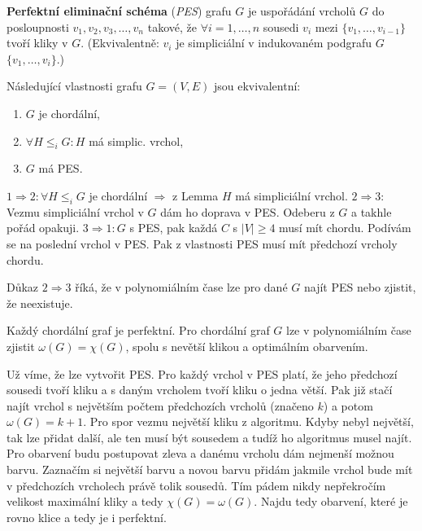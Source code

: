 \begin{definice}
	\textbf{Perfektní eliminační schéma} (\textit{PES}) grafu $G$ je uspořádání vrcholů $G$ do posloupnosti $v_{1}, v_{2}, v_{3}, \dots, v_{n}$ takové, že $\forall i = 1, \dots ,n$ sousedi $v_{i}$ mezi $\{v_{1}, \dots, v_{i-1}\}$ tvoří kliky v $G$. (Ekvivalentně: $v_{i}$ je simpliciální v indukovaném podgrafu $G$ $\{v_{1}, \dots, v_{i}\}$.)
\end{definice}

\begin{veta}
	Následující vlastnosti grafu $G = (V,E)$ jsou ekvivalentní:
	
	\begin{enumerate}
		\item $G$ je chordální,
		\item $\forall H \leq_{i} G: H$ má simplic. vrchol,
		\item $G$ má PES.
	\end{enumerate}
\end{veta}

\begin{dukaz}
	$1 \Rightarrow 2: \forall H \leq_{i} G$ je chordální $\Rightarrow$ z Lemma $H$ má simpliciální vrchol. $2 \Rightarrow 3:$ Vezmu simpliciální vrchol v $G$ dám ho doprava v PES. Odeberu z $G$ a takhle pořád opakuji. $3 \Rightarrow 1: G$ s PES, pak každá $C$ s $|V| \geq 4$ musí mít chordu. Podívám se na poslední vrchol v PES. Pak z vlastnosti PES musí mít předchozí vrcholy chordu.
\end{dukaz}

\begin{dusl}
	Důkaz $2 \Rightarrow 3$ říká, že v polynomiálním čase lze pro dané $G$ najít PES nebo zjistit, že neexistuje.
\end{dusl}

\begin{veta}
	Každý chordální graf je perfektní. Pro chordální graf $G$ lze v polynomiálním čase zjistit $\omega(G) = \chi(G)$, spolu s nevětší klikou a optimálním obarvením.
\end{veta}

\begin{dukaz}
	Už víme, že lze vytvořit PES. Pro každý vrchol v PES platí, že jeho předchozí sousedi tvoří kliku a s daným vrcholem tvoří kliku o jedna větší. Pak již stačí najít vrchol s největším počtem předchozích vrcholů (značeno $k$) a potom $\omega(G) = k+1$. Pro spor vezmu největší kliku z algoritmu. Kdyby nebyl největší, tak lze přidat další, ale ten musí být sousedem a tudíž ho algoritmus musel najít. Pro obarvení budu postupovat zleva a danému vrcholu dám nejmenší možnou barvu. Zaznačím si největší barvu a novou barvu přidám jakmile vrchol bude mít v předchozích vrcholech právě tolik sousedů. Tím pádem nikdy nepřekročím velikost maximální kliky a tedy $\chi(G) = \omega(G)$. Najdu tedy obarvení, které je rovno klice a tedy je i perfektní.
\end{dukaz}